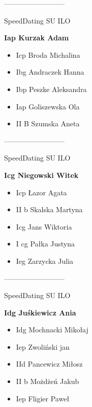 \documentclass[a4paper,10pt]{article}
\begin{document}
\begin{multicols}{3}
\begin{minipage}[l]{\textwidth}
\begin{itemize}
    \end{itemize}



\end{minipage}



\begin{minipage}[l]{\textwidth}
--------------------------

  \footnotesize{SpeedDating SU ILO}

  \bfseries{Iap Kurzak Adam}

  \begin{itemize}
    \item Icp Broda Michalina
    \item Ibg Andraczek Hanna
    \item Ibp Peszke Aleksandra
    \item Iap Goliszewska Ola
    \item II B Szumska Aneta

    \end{itemize}



\end{minipage}



\begin{minipage}[l]{\textwidth}
--------------------------

  \footnotesize{SpeedDating SU ILO}

  \bfseries{Icg Niegowski Witek}

  \begin{itemize}
    \item Icp Łazor Agata
    \item II b Skalska Martyna
    \item Icg Jans Wiktoria
    \item I cg Pałka Justyna
    \item Ieg Zarzycka Julia

    \end{itemize}



\end{minipage}



\begin{minipage}[l]{\textwidth}
--------------------------

  \footnotesize{SpeedDating SU ILO}

  \bfseries{Idg Juśkiewicz Ania}

  \begin{itemize}
    \item Idg Mochnacki Mikołaj
    \item Iep Zwoliński jan
    \item IId Pancewicz Miłosz
    \item II b Możdżeń Jakub
    \item Iep Fligier Paweł


\end{itemize}
\end{minipage}
\end{multicols}
\end{document}
